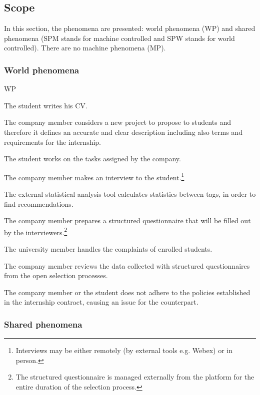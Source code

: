 \subsection{Scope}
In this section, the phenomena are presented: world phenomena (WP) and shared phenomena (SPM stands for machine controlled and SPW stands for world controlled). There are no machine phenomena (MP).
\subsubsection{World phenomena}
\begin{listInSquareBrackets}{WP}
    \item The student writes his CV.
    \item The company member considers a new project to propose to students and therefore it defines an accurate and clear description including also terms and requirements for the internship.
    \item The student works on the tasks assigned by the company.
    \item The company member makes an interview to the student.\footnote{Interviews may be either remotely (by external tools e.g. Webex) or in person.}
    \item The external statistical analysis tool calculates statistics between tags, in order to find recommendations.
    \item The company member prepares a structured questionnaire that will be filled out by the interviewers.\footnote{The structured questionnaire is managed externally from the platform for the entire duration of the selection process.}
    \item The university member handles the complaints of enrolled students.
    \item The company member reviews the data collected with structured questionnaires from the open selection processes.
    \item The company member or the student does not adhere to the policies established in the internship contract, causing an issue for the counterpart.
\end{listInSquareBrackets}

\subsubsection{Shared phenomena}
